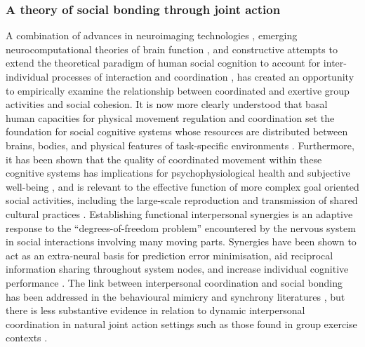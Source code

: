 \subsubsection{A theory of social bonding through joint action}










A combination of advances in neuroimaging technologies \citep{Frith2007}, emerging neurocomputational theories of brain function \citep{Friston2010,Frith2010,Clark2013}, and constructive attempts to extend the theoretical paradigm of human social cognition to account for inter-individual processes of interaction and coordination \citep{Sebanz2006,Dale2014}, has created an opportunity to empirically examine the relationship between coordinated and exertive group activities and social cohesion.  It is now more clearly understood that basal human capacities for physical movement regulation and coordination set the foundation for social cognitive systems whose resources are distributed between brains, bodies, and physical features of task-specific environments \citep{Hutchins2000,Kirsh2006,Semin2008,Semin2012,Coey2012}.  Furthermore, it has been shown that the quality of coordinated movement within these cognitive systems has implications for psychophysiological health and subjective well-being \citep{Wheatley2012}, and is relevant to the effective function of more complex goal oriented social activities, including the large-scale reproduction and transmission of shared cultural practices \citep{Dunbar2012,Roepstorff2010,Claidiere2014,Launay2016}.
Establishing functional interpersonal synergies is an adaptive response to the ``degrees-of-freedom problem'' encountered by the nervous system in social interactions involving many moving parts.  Synergies have been shown to act as an extra-neural basis for prediction error minimisation, aid reciprocal information sharing throughout system nodes, and increase individual cognitive performance \citep{Schmidt2016}.  The link between interpersonal coordination and social bonding has been addressed in the behavioural mimicry and synchrony literatures \citep[e.g.,][]{Wheatley2012,Launay2016,Mogan2017}, but there is less substantive evidence in relation to dynamic interpersonal coordination in natural joint action settings such as those found in group exercise contexts \citep{Marsh2009,Miles2009,Lumsden2012}.



